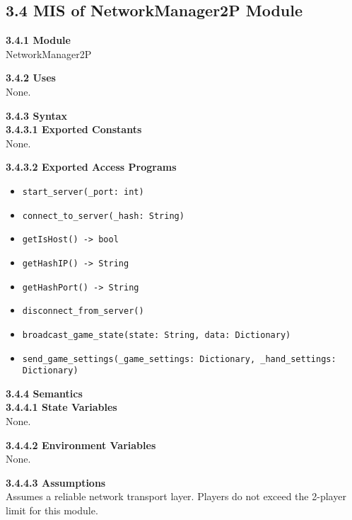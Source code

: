 \documentclass[12pt, titlepage]{article}
\begin{document}
\subsection*{3.4 MIS of NetworkManager2P Module}
\textbf{3.4.1 Module}\\
NetworkManager2P

\textbf{3.4.2 Uses}\\
None.

\textbf{3.4.3 Syntax}\\
\textbf{3.4.3.1 Exported Constants}\\
None.  

\textbf{3.4.3.2 Exported Access Programs}
\begin{itemize}
    \item \texttt{start\_server(\_port: int)}
    \item \texttt{connect\_to\_server(\_hash: String)}
    \item \texttt{getIsHost() -> bool}
    \item \texttt{getHashIP() -> String}
    \item \texttt{getHashPort() -> String}
    \item \texttt{disconnect\_from\_server()}
    \item \texttt{broadcast\_game\_state(state: String, data: Dictionary)}
    \item \texttt{send\_game\_settings(\_game\_settings: Dictionary, \_hand\_settings: Dictionary)}
\end{itemize}

\textbf{3.4.4 Semantics}\\
\textbf{3.4.4.1 State Variables}\\
None.

\textbf{3.4.4.2 Environment Variables}\\
None.

\textbf{3.4.4.3 Assumptions}\\
Assumes a reliable network transport layer. Players do not exceed the 2-player limit for this module.
\end{document}
